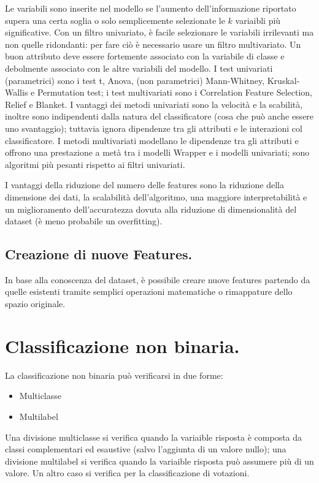 \documentclass[11pt, a4page, twocolumn]{article}
\begin{document}
Le variabili sono inserite nel modello se l'aumento dell'informazione riportato supera una certa soglia o solo semplicemente selezionate le $k$ variaibli più significative.
Con un filtro univariato, è facile selezionare le variabili irrilevanti ma non quelle ridondanti: per fare ciò è necessario usare un filtro multivariato.
Un buon attributo deve essere fortemente associato con la variabile di classe e debolmente associato con le altre variabili del modello.
I test univariati (parametrici) sono i test t, Anova, (non parametrici) Mann-Whitney, Kruskal-Wallis e Permutation test; i test multivariati sono i Correlation Feature Selection, Relief e Blanket.
I vantaggi dei metodi univariati sono la velocità e la scabilità, inoltre sono indipendenti dalla natura del classificatore (cosa che può anche essere uno svantaggio); tuttavia ignora dipendenze tra gli attributi e le interazioni col classificatore. \newline
I metodi multivariati modellano le dipendenze tra gli attributi e offrono una prestazione a metà tra i modelli Wrapper e i modelli univariati; sono algoritmi più pesanti rispetto ai filtri univariati.

I vantaggi della riduzione del numero delle features sono la riduzione della dimensione dei dati, la scalabilità dell'algoritmo, una maggiore interpretabilità e un miglioramento dell'accuratezza dovuta alla riduzione di dimensionalità del dataset (è meno probabile un overfitting).

\subsection{Creazione di nuove Features.}
In base alla conoscenza del dataset, è possibile creare nuove features partendo da quelle esistenti tramite semplici operazioni matematiche o rimappature dello spazio originale.


\section{Classificazione non binaria.}
La classificazione non binaria può verificarsi in due forme:
\begin{itemize}
  \item Multiclasse
  \item Multilabel
\end{itemize}
Una divisione multiclasse si verifica quando la variaible risposta è composta da classi complementari ed esaustive (salvo l'aggiunta di un valore nullo); una divisione multilabel si verifica quando la variaible risposta può assumere più di un valore.
Un altro caso si verifica per la classificazione di votazioni.
\end{document}

